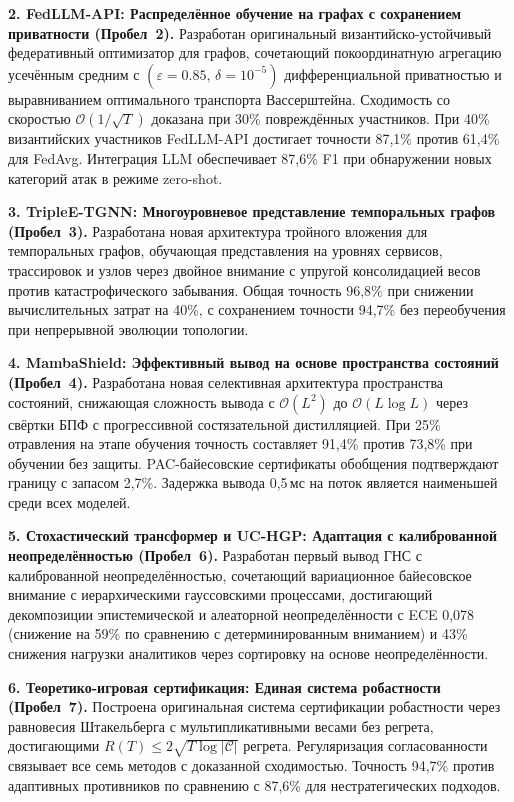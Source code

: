 \noindent\textbf{2. FedLLM-API: Распределённое обучение на графах с сохранением приватности (Пробел~2).}
Разработан оригинальный византийско-устойчивый федеративный оптимизатор для графов, сочетающий покоординатную агрегацию усечённым средним с $(\varepsilon{=}0.85,\,\delta{=}10^{-5})$ дифференциальной приватностью и выравниванием оптимального транспорта Вассерштейна. Сходимость со скоростью $\mathcal{O}(1/\sqrt{T})$ доказана при 30\% повреждённых участников. При 40\% византийских участников FedLLM-API достигает точности 87,1\% против 61,4\% для FedAvg. Интеграция LLM обеспечивает 87,6\% F1 при обнаружении новых категорий атак в режиме zero-shot.

\noindent\textbf{3. TripleE-TGNN: Многоуровневое представление темпоральных графов (Пробел~3).}
Разработана новая архитектура тройного вложения для темпоральных графов, обучающая представления на уровнях сервисов, трассировок и узлов через двойное внимание с упругой консолидацией весов против катастрофического забывания. Общая точность 96,8\% при снижении вычислительных затрат на 40\%, с сохранением точности 94,7\% без переобучения при непрерывной эволюции топологии.

\noindent\textbf{4. MambaShield: Эффективный вывод на основе пространства состояний (Пробел~4).}
Разработана новая селективная архитектура пространства состояний, снижающая сложность вывода с $\mathcal{O}(L^{2})$ до $\mathcal{O}(L\log L)$ через свёртки БПФ с прогрессивной состязательной дистилляцией. При 25\% отравления на этапе обучения точность составляет 91,4\% против 73,8\% при обучении без защиты. PAC-байесовские сертификаты обобщения подтверждают границу с запасом 2,7\%. Задержка вывода 0,5\,мс на поток является наименьшей среди всех моделей.

\noindent\textbf{5. Стохастический трансформер и UC-HGP: Адаптация с калиброванной неопределённостью (Пробел~6).}
Разработан первый вывод ГНС с калиброванной неопределённостью, сочетающий вариационное байесовское внимание с иерархическими гауссовскими процессами, достигающий декомпозиции эпистемической и алеаторной неопределённости с ECE 0,078 (снижение на 59\% по сравнению с детерминированным вниманием) и 43\% снижения нагрузки аналитиков через сортировку на основе неопределённости.

\noindent\textbf{6. Теоретико-игровая сертификация: Единая система робастности (Пробел~7).}
Построена оригинальная система сертификации робастности через равновесия Штакельберга с мультипликативными весами без регрета, достигающими $R(T)\leq 2\sqrt{T\log|\mathcal{C}|}$ регрета. Регуляризация согласованности связывает все семь методов с доказанной сходимостью. Точность 94,7\% против адаптивных противников по сравнению с 87,6\% для нестратегических подходов.

